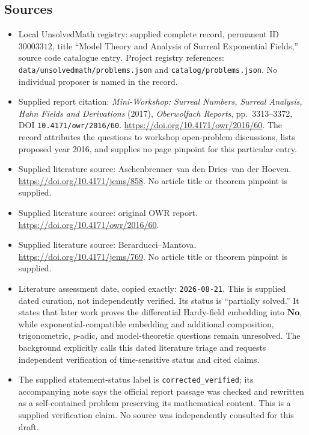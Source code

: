 \documentclass[11pt]{article}
\begin{document}
\subsection{Sources}
\begin{itemize}
\item Local UnsolvedMath registry: supplied complete record, permanent ID \(30003312\), title ``Model Theory and Analysis of Surreal Exponential Fields,'' source code \(\text{catalogue entry}\). Project registry references: \texttt{data/unsolvedmath/problems.json} and \texttt{catalog/problems.json}. No individual proposer is named in the record.
\item Supplied report citation: \emph{Mini-Workshop: Surreal Numbers, Surreal Analysis, Hahn Fields and Derivations} (2017), \emph{Oberwolfach Reports}, pp.~3313--3372, DOI \texttt{10.4171/owr/2016/60}. \url{https://doi.org/10.4171/owr/2016/60}. The record attributes the questions to workshop open-problem discussions, lists proposed year 2016, and supplies no page pinpoint for this particular entry.
\item Supplied literature source: Aschenbrenner--van den Dries--van der Hoeven. \url{https://doi.org/10.4171/jems/858}. No article title or theorem pinpoint is supplied.
\item Supplied literature source: original OWR report. \url{https://doi.org/10.4171/owr/2016/60}.
\item Supplied literature source: Berarducci--Mantova. \url{https://doi.org/10.4171/jems/769}. No article title or theorem pinpoint is supplied.
\item Literature assessment date, copied exactly: \texttt{2026-08-21}. This is supplied dated curation, not independently verified. Its status is ``partially solved.'' It states that later work proves the differential Hardy-field embedding into \(\mathbf{No}\), while exponential-compatible embedding and additional composition, trigonometric, \(p\)-adic, and model-theoretic questions remain unresolved. The background explicitly calls this dated literature triage and requests independent verification of time-sensitive status and cited claims.
\item The supplied statement-status label is \texttt{corrected\_verified}; its accompanying note says the official report passage was checked and rewritten as a self-contained problem preserving its mathematical content. This is a supplied verification claim. No source was independently consulted for this draft.
\end{itemize}
\end{document}
